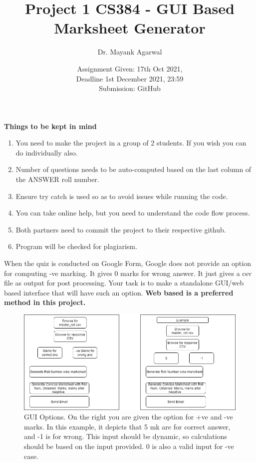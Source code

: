 \documentclass{article}
\title{Project 1 CS384 -   GUI Based Marksheet Generator}
\author{Dr. Mayank Agarwal}
\date{Assignment Given: 17th Oct 2021,\\ Deadline 1st December 2021,  
23:59\\Submission: GitHub }
\begin{document}
	\maketitle  
	\textbf{Things to be kept in mind} 
	\begin{enumerate}
\item You need to make the project in a group of 2 students. If you wish you 
can do individually also. 
\item Number of questions needs to be auto-computed based on the last 
column of the ANSWER roll number. 	

\item Ensure try catch is used so as to avoid issues while running the code. 

\item You can take online help, but you need to understand the code flow 
process.

\item Both partners need to commit the project to their respective github. 
\item Program will be checked for plagiarism.   
\end{enumerate}

When the quiz is conducted on Google Form, Google does not provide an option 
for computing -ve marking. It gives 0 marks for wrong answer. It just gives a 
csv file as output for post 
processing. Your task is to make a standalone GUI/web based interface that will 
have such an option. \textbf{Web based is a preferred method in this project. }

\begin{figure}
	\centering
	\includegraphics[width=0.99\linewidth]{Python_Project.png}
	\caption{GUI Options. On the right you are given the option for +ve and -ve 
	marks. In this example, it depicts that 5 mk are for correct answer, and -1 
	is for wrong. This input  should be dynamic, so calculations should be 
	based on the input provided. 0 is also a valid input for -ve case.}
	\label{fig:marksheet_project}
\end{figure}
\end{document}
